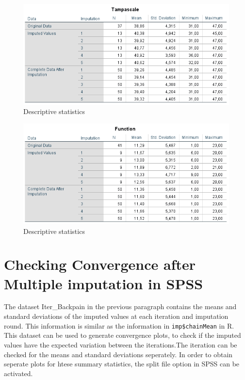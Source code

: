 \documentclass[]{book}
\begin{document}
\begin{figure}

{\centering \includegraphics[width=0.9\linewidth]{images/tab4.7} 

}

\caption{Descriptive statistics}\label{fig:tab4-7}
\end{figure}\begin{figure}

{\centering \includegraphics[width=0.9\linewidth]{images/tab4.8} 

}

\caption{Descriptive statistics}\label{fig:tab4-7}
\end{figure}

\section{Checking Convergence after Multiple imputation in
SPSS}\label{checking-convergence-after-multiple-imputation-in-spss}

The dataset Iter\_Backpain in the previous paragraph contains the means
and standard deviations of the imputed values at each iteration and
imputation round. This information is similar as the information in
\texttt{imp\$chainMean} in R. This dataset can be used to generate
convergence plots, to check if the imputed values have the expected
variation between the iterations.The iteration can be checked for the
means and standard deviations seperately. In order to obtain seperate
plots for htese summary statistics, the split file option in SPSS can be
activated.
\end{document}
